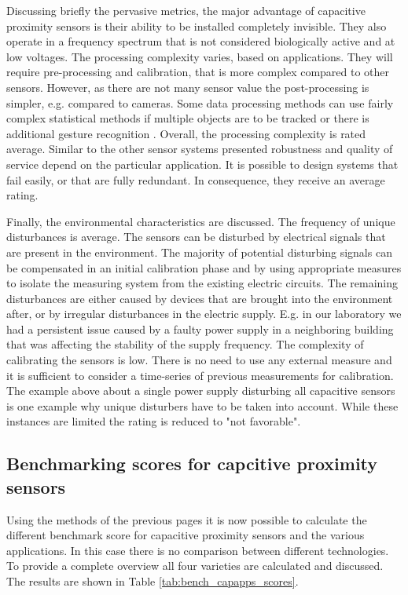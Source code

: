 Discussing briefly the pervasive metrics, the major advantage of capacitive proximity sensors is their ability to be installed completely invisible. They also operate in a frequency spectrum that is not considered biologically active and at low voltages. The processing complexity varies, based on applications. They will require pre-processing and calibration, that is more complex compared to other sensors. However, as there are not many sensor value the post-processing is simpler, e.g. compared to cameras. Some data processing methods can use fairly complex statistical methods if multiple objects are to be tracked or there is additional gesture recognition \cite{grosse2013swiss}. Overall, the processing complexity is rated average. Similar to the other sensor systems presented robustness and quality of service depend on the particular application. It is possible to design systems that fail easily, or that are fully redundant. In consequence, they receive an average rating. 

Finally, the environmental characteristics are discussed. The frequency of unique disturbances is average. The sensors can be disturbed by electrical signals that are present in the environment. The majority of potential disturbing signals can be compensated in an initial calibration phase and by using appropriate measures to isolate the measuring system from the existing electric circuits. The remaining disturbances are either caused by devices that are brought into the environment after, or by irregular disturbances in the electric supply. E.g. in our laboratory we had a persistent issue caused by a faulty power supply in a neighboring building that was affecting the stability of the supply frequency. The complexity of calibrating the sensors is low. There is no need to use any external measure and it is sufficient to consider a time-series of previous measurements for calibration. The example above about a single power supply disturbing all capacitive sensors is one example why unique disturbers have to be taken into account. While these instances are limited the rating is reduced to "not favorable".


\subsection{Benchmarking scores for capcitive proximity sensors}

Using the methods of the previous pages it is now possible to calculate the different benchmark score for capacitive proximity sensors and the various applications. In this case there is no comparison between different technologies. To provide a complete overview all four varieties are calculated and discussed. The results are shown in Table \ref{tab:bench_capapps_scores}. 

